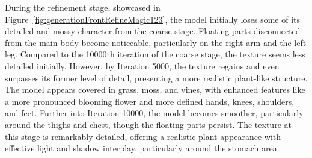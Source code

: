 During the refinement stage, showcased in Figure~\ref{fig:generationFrontRefineMagic123}, the model initially loses some of its detailed and mossy character from the coarse stage. Floating parts disconnected from the main body become noticeable, particularly on the right arm and the left leg. Compared to the 10000th iteration of the coarse stage, the texture seems less detailed initially. However, by Iteration 5000, the texture regains and even surpasses its former level of detail, presenting a more realistic plant-like structure. The model appears covered in grass, moss, and vines, with enhanced features like a more pronounced blooming flower and more defined hands, knees, shoulders, and feet. Further into Iteration 10000, the model becomes smoother, particularly around the thighs and chest, though the floating parts persist. The texture at this stage is remarkably detailed, offering a realistic plant appearance with effective light and shadow interplay, particularly around the stomach area.

